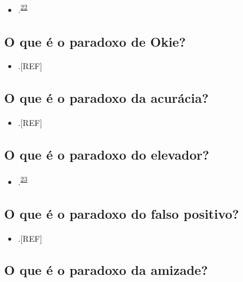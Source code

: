 \documentclass[
  a4paper,
]{book}
\providecommand{\tightlist}{%
  \setlength{\itemsep}{0pt}\setlength{\parskip}{0pt}}
\begin{document}
\begin{itemize}
\tightlist
\item
  .\textsuperscript{\protect\hyperlink{ref-stein1956}{22}}
\end{itemize}

\hypertarget{okie}{%
\subsection{O que é o paradoxo de Okie?}\label{okie}}

\begin{itemize}
\tightlist
\item
  .{[}REF{]}
\end{itemize}

\hypertarget{acuracia}{%
\subsection{O que é o paradoxo da acurácia?}\label{acuracia}}

\begin{itemize}
\tightlist
\item
  .{[}REF{]}
\end{itemize}

\hypertarget{elevador}{%
\subsection{O que é o paradoxo do elevador?}\label{elevador}}

\begin{itemize}
\tightlist
\item
  .\textsuperscript{\protect\hyperlink{ref-de1996}{23}}
\end{itemize}

\hypertarget{falso-positivo}{%
\subsection{O que é o paradoxo do falso positivo?}\label{falso-positivo}}

\begin{itemize}
\tightlist
\item
  .{[}REF{]}
\end{itemize}

\hypertarget{amizade}{%
\subsection{O que é o paradoxo da amizade?}\label{amizade}}
\end{document}
